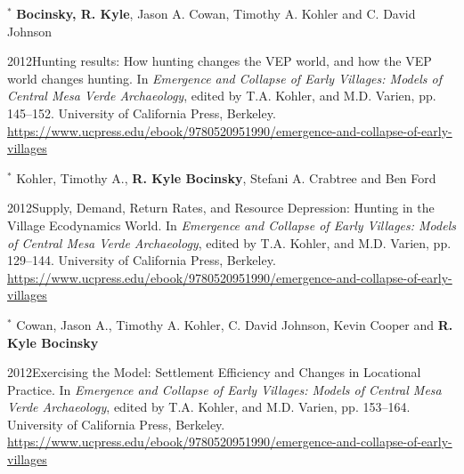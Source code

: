 $^\ast$ {\bf Bocinsky, R. Kyle}, Jason A. Cowan, Timothy A. Kohler and C. David Johnson
\begin{list1}
\item[] 2012\hspace{.2cm}Hunting results: How hunting changes the VEP world, and how the VEP world changes hunting. In \emph{Emergence and Collapse of Early Villages: Models of Central Mesa Verde Archaeology}, edited by T.A. Kohler, and M.D. Varien, pp. 145–152. University of California Press, Berkeley.\\\href{https://www.ucpress.edu/ebook/9780520951990/emergence-and-collapse-of-early-villages}{https://www.ucpress.edu/ebook/9780520951990/emergence-and-collapse-of-early-villages}
\end{list1}


$^\ast$ Kohler, Timothy A., {\bf R. Kyle Bocinsky}, Stefani A. Crabtree and Ben Ford
\begin{list1}
\item[] 2012\hspace{.2cm}Supply, Demand, Return Rates, and Resource Depression: Hunting in the Village
Ecodynamics World. In \emph{Emergence and Collapse of Early Villages: Models of Central Mesa Verde Archaeology}, edited by T.A. Kohler, and M.D. Varien, pp. 129–144. University of California Press, Berkeley.\\\href{https://www.ucpress.edu/ebook/9780520951990/emergence-and-collapse-of-early-villages}{https://www.ucpress.edu/ebook/9780520951990/emergence-and-collapse-of-early-villages}
\end{list1}


$^\ast$ Cowan, Jason A., Timothy A. Kohler, C. David Johnson, Kevin Cooper and {\bf R. Kyle Bocinsky}
\begin{list1}
\item[] 2012\hspace{.2cm}Exercising the Model: Settlement Efficiency and Changes in Locational Practice. In \emph{Emergence and Collapse of Early Villages: Models of Central Mesa Verde Archaeology}, edited by T.A. Kohler, and M.D. Varien, pp. 153–164. University of California Press, Berkeley.\\\href{https://www.ucpress.edu/ebook/9780520951990/emergence-and-collapse-of-early-villages}{https://www.ucpress.edu/ebook/9780520951990/emergence-and-collapse-of-early-villages}
\end{list1}
